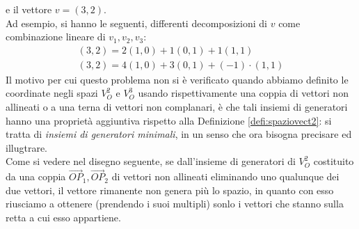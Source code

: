 \documentclass{book}
\theoremstyle{definition}
\theoremstyle{plain}
\begin{document}
e il vettore $v=(3,2)$.\\
Ad esempio, si hanno le seguenti, differenti decomposizioni di $v$ come combinazione lineare di $v_1,v_2,v_3$:
\begin{eqnarray*}
  (3,2)=2(1,0)+1(0,1)+1(1,1)\\
  (3,2)=4(1,0)+3(0,1)+(-1)\cdot(1,1)
\end{eqnarray*}
Il motivo per cui questo problema non si è verificato quando abbiamo definito le coordinate negli spazi $V_O^2$ e $V_O^3$ usando rispettivamente una coppia di vettori non allineati o a una terna di vettori non complanari, è che tali insiemi di generatori hanno una proprietà aggiuntiva rispetto alla Definizione \ref{defi:spaziovect2}: si tratta di \textit{insiemi di generatori minimali}, in un senso che ora bisogna precisare ed illugtrare.\\
Come si vedere nel disegno seguente, se dall'insieme di generatori di $V_O^2$ costituito da una coppia $\vec{OP}_1,\vec{OP}_2$ di vettori non allineati eliminando uno qualunque dei due vettori, il vettore rimanente non genera più lo spazio, in quanto con esso riusciamo a ottenere (prendendo i suoi multipli) sonlo i vettori che stanno sulla retta a cui esso appartiene.
\end{document}
